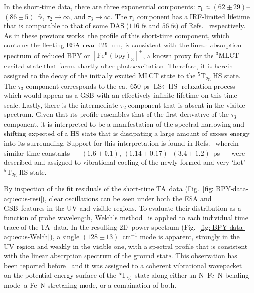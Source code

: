 In the short-time data, there are three exponential components:
$\tau_1 \approx (62 \pm 29)$--$(86 \pm 5)$~fs, $\tau_2 \rightarrow \infty$,
and $\tau_3 \rightarrow \infty$.
%
The $\tau_1$ component has a IRF-limited lifetime that is comparable to
that of some DAS ($116$ fs and $56$ fs) of Refs.~\cite{Gawelda2007a, Aubock2015} respectively.
As in these previous works, the profile of this short-time component,
which contains the fleeting ESA near $425$~nm, is consistent with the linear absorption spectrum
of reduced BPY or $\mathrm{[Fe^{II}(bpy)_3]^+}$,
a known proxy for the $\mathrm{^3 MLCT}$ excited state
that forms shortly after photoexcitation.
Therefore, it is herein assigned to the decay of the initially excited $\mathrm{MLCT}$ state
to the $\mathrm{^5 T_{2g}}$ HS state.
%
The $\tau_3$ component corresponds to the ca.~650-ps $\text{LS} \leftarrow \text{HS}$
relaxation process which would appear as a GSB with an effectively infinite lifetime
on this time scale.
%
Lastly, there is the intermediate $\tau_2$ component that is absent in the visible spectrum.
Given that its profile resembles that of the first derivative of the $\tau_3$ component,
it is interpreted to be a manifestation of the spectral narrowing and shifting expected
of a HS state that is dissipating a large amount of excess energy into its surrounding.
%
Support for this interpretation is found in Refs.~\cite{Consani2009, Lemke2017}
wherein similar time constants --- $(1.6 \pm 0.1)$, $(1.14 \pm 0.17)$, $(3.4 \pm 1.2)$~ps ---
were described and assigned to vibrational cooling of
the newly formed and very `hot' $\mathrm{^5 T_{2g}}$ HS state.

By inspection of the fit residuals of the short-time TA~data
(Fig.~\ref{fig: BPY-data-aqueous-resi}),
clear oscillations can be seen under both the ESA and GSB~features
in the UV and visible regions.
%
To evaluate their distribution as a function of probe wavelength,
Welch's method~\cite{Welch1967} is applied to each individual time trace of the TA~data.
%
In the resulting 2D~power spectrum (Fig.~\ref{fig: BPY-data-aqueous-Welch}),
a single $(128 \pm 13)$~cm$^{-1}$ mode is apparent, strongly in the UV region
and weakly in the visible one, with a spectral profile that is consistent
with the linear absorption spectrum of the ground state.
%
This observation has been reported before~\cite{Consani2009, Aubock2015}
and it was assigned to a coherent vibrational wavepacket on the potential energy surface of
the $\mathrm{^5 T_{2g}}$~state along either an N--Fe--N bending mode,
a Fe--N stretching mode, or a combination of both.

